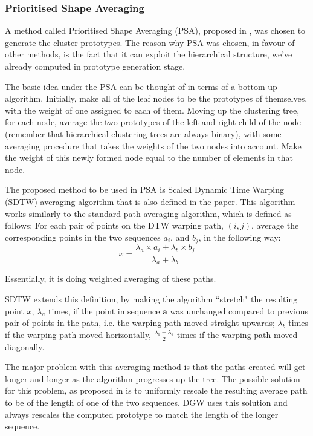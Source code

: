 \documentclass[parskip]{cs4rep}
\begin{document}
\subsubsection{Prioritised Shape Averaging}
A method called Prioritised Shape Averaging (PSA), proposed in \cite{Niennattrakul:2009ep}, was chosen to generate the cluster prototypes. The reason why PSA was chosen, in favour of other methods, is the fact that it can exploit the hierarchical structure, we've already computed in prototype generation stage.

The basic idea under the PSA can be thought of in terms of a bottom-up algorithm.
Initially, make all of the leaf nodes to be the prototypes of themselves, with the weight of one assigned to each of them. Moving up the clustering tree, for each node, average the two prototypes of the left and right child of the node (remember that hierarchical clustering trees are always binary), with some averaging procedure that takes the weights of the two nodes into account. Make the weight of this newly formed node equal to the number of elements in that node.

The proposed method to be used in PSA is Scaled Dynamic Time Warping (SDTW) averaging algorithm that is also defined in the paper. This algorithm works similarly to the standard path averaging algorithm, which is defined as follows: For each pair of points on the DTW warping path, $(i,j)$, average the corresponding points in the two sequences $a_i$, and $b_j$, in the following way:
\begin{equation} \label{eq:standard_path_averaging}
 x =  \frac{\lambda_a \times a_i + \lambda_b \times b_j}{\lambda_a + \lambda_b}
\end{equation}

Essentially, it is doing weighted averaging of these paths.

SDTW extends this definition, by making the algorithm ``stretch" the resulting point $x$,  $\lambda_a$ times, if the point in sequence $\mathbf{a}$ was unchanged compared to previous pair of points in the path, i.e. the warping path moved straight upwards; $\lambda_b$ times if the warping path moved horizontally, $\frac{\lambda_a + \lambda_b}{2}$ times if the warping path moved diagonally.

The major problem with this averaging method is that the paths created will get longer and longer as the algorithm progresses up the tree. The possible solution for this problem, as proposed in \cite{Niennattrakul:2009ep} is to uniformly rescale the resulting average path to be of the length of one of the two sequences. DGW uses this solution and always rescales the computed prototype to match the length of the longer sequence. 
\end{document}
